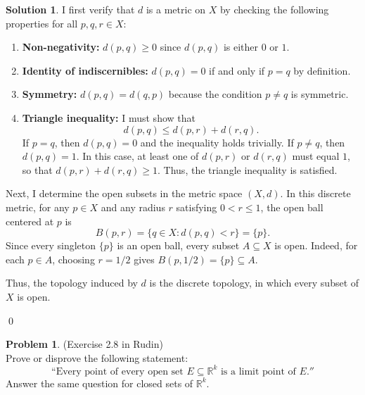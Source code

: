 \documentclass[12pt,oneside]{article}
\theoremstyle{definition}
\newtheorem{problem}{Problem}
\newtheorem{solution}{Solution}
\begin{document}
\begin{solution}
I first verify that \( d \) is a metric on \( X \) by checking the following properties for all \( p, q, r \in X \):
\begin{enumerate}
    \item \textbf{Non-negativity:} \( d(p,q) \ge 0 \) since \( d(p,q) \) is either \( 0 \) or \( 1 \).
    \item \textbf{Identity of indiscernibles:} \( d(p,q) = 0 \) if and only if \( p = q \) by definition.
    \item \textbf{Symmetry:} \( d(p,q) = d(q,p) \) because the condition \( p \neq q \) is symmetric.
    \item \textbf{Triangle inequality:} I must show that
    \[
    d(p,q) \le d(p,r) + d(r,q).
    \]
    If \( p = q \), then \( d(p,q)=0 \) and the inequality holds trivially. If \( p \neq q \), then \( d(p,q)=1 \). In this case, at least one of \( d(p,r) \) or \( d(r,q) \) must equal \( 1 \), so that \( d(p,r) + d(r,q) \ge 1 \). Thus, the triangle inequality is satisfied.
\end{enumerate}

Next, I determine the open subsets in the metric space \( (X,d) \). In this discrete metric, for any \( p \in X \) and any radius \( r \) satisfying \( 0 < r \le 1 \), the open ball centered at \( p \) is
\[
B(p, r) = \{ q \in X : d(p,q) < r \} = \{ p \}.
\]
Since every singleton \( \{p\} \) is an open ball, every subset \( A \subseteq X \) is open. Indeed, for each \( p \in A \), choosing \( r = 1/2 \) gives \( B(p,1/2) = \{p\} \subseteq A \).

Thus, the topology induced by \( d \) is the discrete topology, in which every subset of \( X \) is open.

\qed
\end{solution}

\newpage
\begin{problem}
(Exercise 2.8 in Rudin)\\[1mm]
Prove or disprove the following statement:
\[
\text{``Every point of every open set } E \subseteq \mathbb{R}^k \text{ is a limit point of } E.'' 
\]
Answer the same question for closed sets of \( \mathbb{R}^k \).
\end{problem}
\newpage
\end{document}
